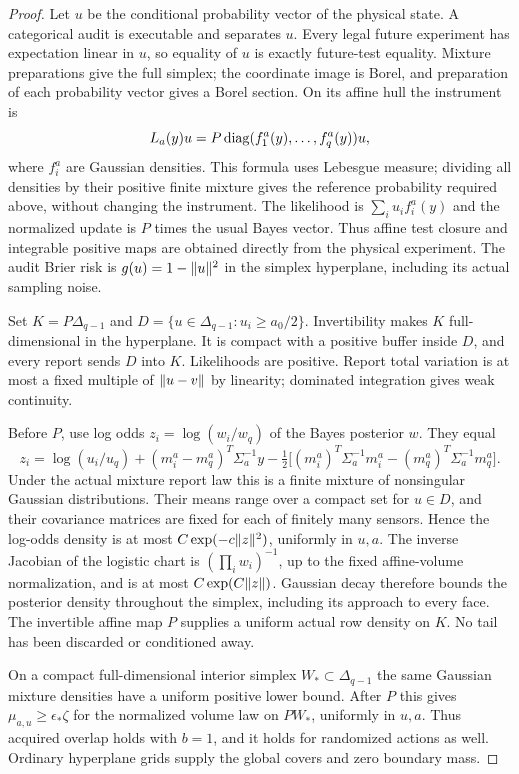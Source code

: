 \begin{proof}
Let $u$ be the conditional probability vector of the physical state. A categorical audit is executable and separates $u$. Every legal future experiment has expectation linear in $u$, so equality of $u$ is exactly future-test equality. Mixture preparations give the full simplex; the coordinate image is Borel, and preparation of each probability vector gives a Borel section. On its affine hull the instrument is
\[
 L_a(y)u=P\operatorname{diag}(f_1^a(y),\ldots,f_q^a(y))u,
\]
where $f_i^a$ are Gaussian densities. This formula uses Lebesgue measure; dividing all densities by their positive finite mixture gives the reference probability required above, without changing the instrument. The likelihood is $\sum_i u_if_i^a(y)$ and the normalized update is $P$ times the usual Bayes vector. Thus affine test closure and integrable positive maps are obtained directly from the physical experiment. The audit Brier risk is $g(u)=1-\lVert u\rVert^2$ in the simplex hyperplane, including its actual sampling noise.

Set $K=P\Delta_{q-1}$ and $D=\{u\in\Delta_{q-1}:u_i\ge a_0/2\}$. Invertibility makes $K$ full-dimensional in the hyperplane. It is compact with a positive buffer inside $D$, and every report sends $D$ into $K$. Likelihoods are positive. Report total variation is at most a fixed multiple of $\lVert u-v\rVert$ by linearity; dominated integration gives weak continuity.

Before $P$, use log odds $z_i=\log(w_i/w_q)$ of the Bayes posterior $w$. They equal
\[
 z_i=\log(u_i/u_q)+(m_i^a-m_q^a)^T\Sigma_a^{-1}y
       -\tfrac12\bigl[(m_i^a)^T\Sigma_a^{-1}m_i^a
                        -(m_q^a)^T\Sigma_a^{-1}m_q^a\bigr].
\]
Under the actual mixture report law this is a finite mixture of nonsingular Gaussian distributions. Their means range over a compact set for $u\in D$, and their covariance matrices are fixed for each of finitely many sensors. Hence the log-odds density is at most $C\exp(-c\lVert z\rVert^2)$, uniformly in $u,a$. The inverse Jacobian of the logistic chart is $(\prod_iw_i)^{-1}$, up to the fixed affine-volume normalization, and is at most $C\exp(C\lVert z\rVert)$. Gaussian decay therefore bounds the posterior density throughout the simplex, including its approach to every face. The invertible affine map $P$ supplies a uniform actual row density on $K$. No tail has been discarded or conditioned away.

On a compact full-dimensional interior simplex $W_*\subset\Delta_{q-1}$ the same Gaussian mixture densities have a uniform positive lower bound. After $P$ this gives $\mu_{a,u}\ge\epsilon_*\zeta$ for the normalized volume law on $PW_*$, uniformly in $u,a$. Thus acquired overlap holds with $b=1$, and it holds for randomized actions as well. Ordinary hyperplane grids supply the global covers and zero boundary mass.


\end{proof}
